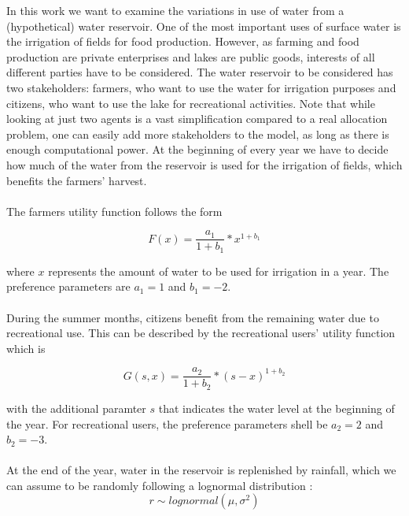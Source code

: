\documentclass[12pt, a4paper, oneside]{article}
\begin{document}
In this work we want to examine the variations in use of water from a (hypothetical) water reservoir.
One of the most important uses of surface water is the irrigation of fields for food production. However, as farming and food production are private enterprises and lakes are public goods, interests of all different parties have to be considered.
The water reservoir to be considered has two stakeholders: farmers, who want to use the water for irrigation purposes and citizens, who want to use the lake for recreational activities.
Note that while looking at just two agents is a vast simplification compared to a real allocation problem, one can easily add more stakeholders to the model, as long as there is enough computational power.
At the beginning of every year we have to decide how much of the water from the reservoir is used for the irrigation of fields, which benefits the farmers' harvest.\\\\
The farmers utility function follows the form 

\begin{equation}
	F(x) = \frac{a_1}{1+b_1} * x^{1+b_1}
\end{equation}

where $x$ represents the amount of water to be used for irrigation in a year. The preference parameters are $a_1 = 1$ and $b_1 = -2$.\\\\

During the summer months, citizens benefit from the remaining water due to recreational use.
This can be described by the recreational users' utility function which is

\begin{equation}
  G(s, x) = \frac{a_2}{1+b_2} * (s-x)^{1+b_2}
\end{equation}

with the additional paramter $s$ that indicates the water level at the beginning of the year.
For recreational users, the preference parameters shell be $a_2 = 2$ and $b_2 = -3$.\\\\

At the end of the year, water in the reservoir is replenished by rainfall, which we can assume to be randomly following a lognormal distribution \citep{oosterbaan1994frequency}:
\begin{equation}
	r \sim lognormal(\mu, \sigma^2)
\end{equation}
\end{document}
